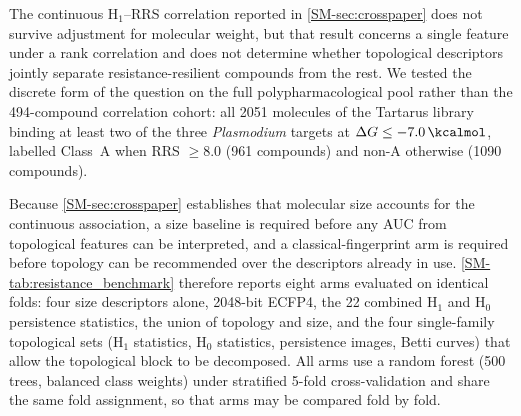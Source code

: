 \documentclass[11pt,a4paper]{article}
\begin{document}
The continuous H$_1$--RRS correlation reported in \cref{SM-sec:crosspaper} does not survive adjustment for molecular weight, but that result concerns a single feature under a rank correlation and does not determine whether topological descriptors jointly separate resistance-resilient compounds from the rest. We tested the discrete form of the question on the full polypharmacological pool rather than the \num{494}-compound correlation cohort: all \num{2051} molecules of the Tartarus library binding at least two of the three \textit{Plasmodium} targets at $\Delta G \leq \SI{-7.0}{\kcalmol}$, labelled Class~A when RRS $\geq \num{8.0}$ (\num{961} compounds) and non-A otherwise (\num{1090} compounds).

Because \cref{SM-sec:crosspaper} establishes that molecular size accounts for the continuous association, a size baseline is required before any AUC from topological features can be interpreted, and a classical-fingerprint arm is required before topology can be recommended over the descriptors already in use. \cref{SM-tab:resistance_benchmark} therefore reports eight arms evaluated on identical folds: four size descriptors alone, \num{2048}-bit ECFP4, the 22 combined H$_1$ and H$_0$ persistence statistics, the union of topology and size, and the four single-family topological sets (H$_1$ statistics, H$_0$ statistics, persistence images, Betti curves) that allow the topological block to be decomposed. All arms use a random forest (500 trees, balanced class weights) under stratified 5-fold cross-validation and share the same fold assignment, so that arms may be compared fold by fold.
\end{document}
